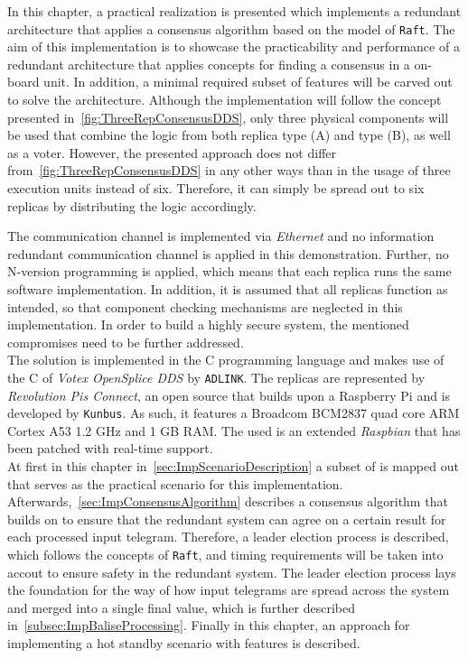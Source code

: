 In this chapter, a practical realization is presented which implements a redundant architecture that applies a consensus algorithm based on the model of \texttt{Raft}.
The aim of this implementation is to showcase the practicability and performance of a redundant architecture that applies  concepts for finding a consensus in a  on-board unit.
In addition, a minimal required subset of  features will be carved out to solve the architecture.
Although the implementation will follow the concept presented in~\autoref{fig:ThreeRepConsensusDDS}, only three physical components will be used that combine the logic from both replica type (A) and type (B), as well as a voter.
However, the presented approach does not differ from~\autoref{fig:ThreeRepConsensusDDS} in any other ways than in the usage of three execution units instead of six.
Therefore, it can simply be spread out to six replicas by distributing the logic accordingly.

The communication channel is implemented via \textit{Ethernet} and no information redundant communication channel is applied in this demonstration.
Further, no N-version programming is applied, which means that each replica runs the same software implementation.
In addition, it is assumed that all replicas function as intended, so that component checking mechanisms are neglected in this implementation.
In order to build a highly secure system, the mentioned compromises need to be further addressed.
\\

The solution is implemented in the C programming language and makes use of the C  of \textit{Votex OpenSplice DDS} by \texttt{ADLINK}.
The replicas are represented by \textit{Revolution Pis Connect}, an open source  that builds upon a Raspberry Pi and is developed by \texttt{Kunbus}.
As such, it features a Broadcom BCM2837 quad core ARM Cortex A53 1.2 GHz  and 1 GB RAM.
The used  is an extended \textit{Raspbian}  that has been patched with real-time support.
\\

At first in this chapter in~\autoref{sec:ImpScenarioDescription} a subset of  is mapped out that serves as the practical scenario for this implementation.
Afterwards,~\autoref{sec:ImpConsensusAlgorithm} describes a consensus algorithm that builds on  to ensure that the redundant system can agree on a certain result for each processed input telegram.
Therefore, a leader election process is described, which follows the concepts of \texttt{Raft}, and timing requirements will be taken into accout to ensure safety in the redundant system.
The leader election process lays the foundation for the way of how input telegrams are spread across the system and merged into a single final value, which is further described in~\autoref{subsec:ImpBaliseProcessing}.
Finally in this chapter, an approach for implementing a hot standby scenario with  features is described.

